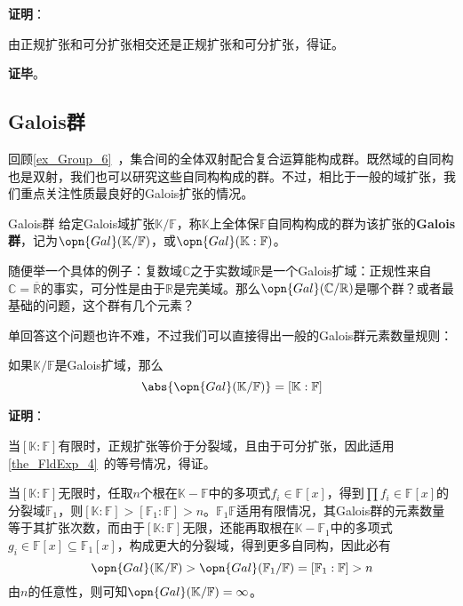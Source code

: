 \textbf{证明}：

由正规扩张和可分扩张相交还是正规扩张和可分扩张，得证。

\textbf{证毕}。



\subsection{Galois群}

回顾\autoref{ex_Group_6}~，集合间的全体双射配合复合运算能构成群。既然域的自同构也是双射，我们也可以研究这些自同构构成的群。不过，相比于一般的域扩张，我们重点关注性质最良好的Galois扩张的情况。

\begin{definition}{Galois群}\label{def_GExt_2}
给定Galois域扩张$\mathbb{K}/\mathbb{F}$，称$\mathbb{K}$上全体保$\mathbb{F}$自同构构成的群为该扩张的\textbf{Galois 群}，记为$\opn{Gal}(\mathbb{K}/\mathbb{F})$，或$\opn{Gal}(\mathbb{K}:\mathbb{F})$。
\end{definition}


随便举一个具体的例子：复数域$\mathbb{C}$之于实数域$\mathbb{R}$是一个Galois扩域：正规性来自$\mathbb{C}=\overline{\mathbb{R}}$的事实，可分性是由于$\mathbb{R}$是完美域。那么$\opn{Gal}(\mathbb{C}/\mathbb{R})$是哪个群？或者最基础的问题，这个群有几个元素？

单回答这个问题也许不难，不过我们可以直接得出一般的Galois群元素数量规则：

\begin{theorem}{}\label{the_GExt_2}
如果$\mathbb{K}/\mathbb{F}$是Galois扩域，那么
\begin{equation}
\abs{\opn{Gal}(\mathbb{K}/\mathbb{F})} = [\mathbb{K}:\mathbb{F}]
\end{equation}
\end{theorem}

\textbf{证明}：

当$[\mathbb{K}:\mathbb{F}]$有限时，正规扩张等价于分裂域，且由于可分扩张，因此适用\autoref{the_FldExp_4}~的等号情况，得证。

当$[\mathbb{K}:\mathbb{F}]$无限时，任取$n$个根在$\mathbb{K}-\mathbb{F}$中的多项式$f_i\in\mathbb{F}[x]$，得到$\prod f_i\in\mathbb{F}[x]$的分裂域$\mathbb{F}_1$，则$[\mathbb{K}:\mathbb{F}]>[\mathbb{F}_1:\mathbb{F}]>n$。$\mathbb{F}_1\mathbb{F}$适用有限情况，其Galois群的元素数量等于其扩张次数，而由于$[\mathbb{K}:\mathbb{F}]$无限，还能再取根在$\mathbb{K}-\mathbb{F}_1$中的多项式$g_i\in\mathbb{F}[x]\subseteq \mathbb{F}_1[x]$，构成更大的分裂域，得到更多自同构，因此必有
\begin{equation}
\opn{Gal}(\mathbb{K}/\mathbb{F})>\opn{Gal}(\mathbb{F}_1/\mathbb{F})=[\mathbb{F}_1:\mathbb{F}]>n
\end{equation}
由$n$的任意性，则可知$\opn{Gal}(\mathbb{K}/\mathbb{F})=\infty$。

